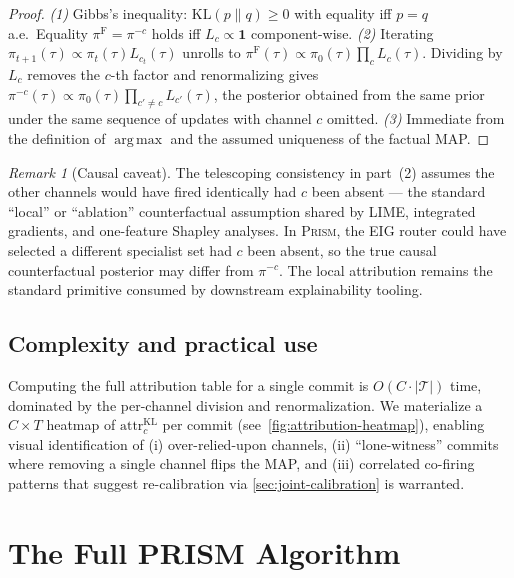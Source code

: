 \documentclass[11pt,a4paper]{article}
\newcommand{\KL}{\mathrm{KL}}
\newcommand{\Tcal}{\mathcal{T}}
\DeclareMathOperator*{\argmax}{arg\,max}
\theoremstyle{plain}
\theoremstyle{definition}
\theoremstyle{remark}
\newtheorem{remark}[theorem]{Remark}
\begin{document}
\begin{proof}
\emph{(1)} Gibbs's inequality: $\KL(p\|q) \geq 0$ with equality iff
$p = q$ a.e.\ Equality $\pi^{\mathrm F} = \pi^{-c}$ holds iff
$L_c \propto \mathbf{1}$ component-wise.
\emph{(2)} Iterating $\pi_{t+1}(\tau) \propto \pi_t(\tau) L_{c_t}(\tau)$
unrolls to $\pi^{\mathrm F}(\tau) \propto \pi_0(\tau) \prod_c L_c(\tau)$.
Dividing by $L_c$ removes the $c$-th factor and renormalizing gives
$\pi^{-c}(\tau) \propto \pi_0(\tau) \prod_{c' \ne c} L_{c'}(\tau)$,
the posterior obtained from the same prior under the same sequence
of updates with channel $c$ omitted.
\emph{(3)} Immediate from the definition of $\argmax$ and the
assumed uniqueness of the factual MAP.
\end{proof}

\begin{remark}[Causal caveat]
The telescoping consistency in part~(2) assumes the other channels
would have fired identically had $c$ been absent --- the standard
``local'' or ``ablation'' counterfactual assumption shared by LIME,
integrated gradients, and one-feature Shapley analyses. In
\textsc{Prism}, the EIG router could have selected a different
specialist set had $c$ been absent, so the true causal counterfactual
posterior may differ from $\pi^{-c}$. The local attribution remains
the standard primitive consumed by downstream explainability tooling.
\end{remark}

\subsection{Complexity and practical use}

Computing the full attribution table for a single commit is
$O(C \cdot |\Tcal|)$ time, dominated by the per-channel division and
renormalization. We materialize a $C \times T$ heatmap of
$\mathrm{attr}_c^{\KL}$ per commit
(see~\cref{fig:attribution-heatmap}), enabling visual identification
of (i) over-relied-upon channels, (ii) ``lone-witness'' commits
where removing a single channel flips the MAP, and (iii) correlated
co-firing patterns that suggest re-calibration via
\cref{sec:joint-calibration} is warranted.

\section{The Full PRISM Algorithm}
\label{sec:algorithm}
\end{document}
